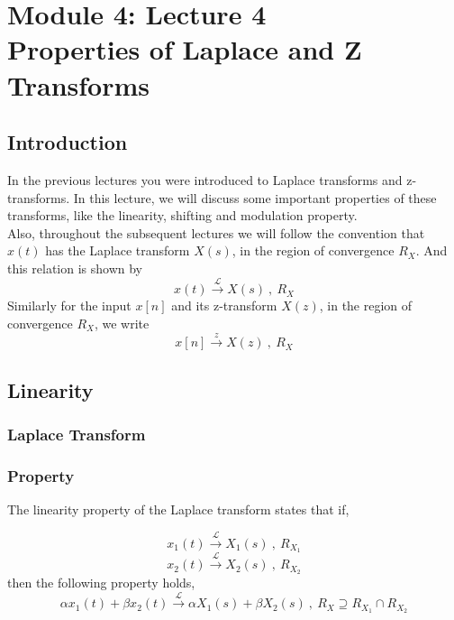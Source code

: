\section{Module 4: Lecture 4\\Properties of Laplace and Z Transforms}


\subsection{Introduction}
In the previous lectures you were introduced to Laplace transforms and z-transforms. In this lecture, we will discuss some important properties of these transforms, like the linearity, shifting and modulation property.\\
Also, throughout the subsequent lectures we will follow the convention that $x(t)$ has the Laplace transform $X(s)$, in the region of convergence $R_X$. And this relation is shown by
\[
x(t) \xrightarrow{\ \mathcal{L}\ } X(s)\ ,\ R_X
\]Similarly for the input $x[n]$ and its z-transform $X(z)$, in the region of convergence $R_X$, we write
\[
x[n] \xrightarrow{\ z\ } X(z)\ ,\ R_X
\]

\subsection{Linearity}
\subsubsection{Laplace Transform}
\subsubsection{Property}
The linearity property of the Laplace transform states that if,

\[
x_1(t) \xrightarrow{\ \mathcal{L}\ } X_1(s)\ ,\ R_{X_1}
\]\[
x_2(t) \xrightarrow{\ \mathcal{L}\ } X_2(s)\ ,\ R_{X_2}
\]
then the following property holds,
\[
\alpha x_1(t) + \beta x_2(t) \xrightarrow{\ \mathcal{L}\ } \alpha X_1(s) + \beta X_2(s) \ ,\ R_X  \supseteq R_{X_1} \cap R_{X_2}
\]

